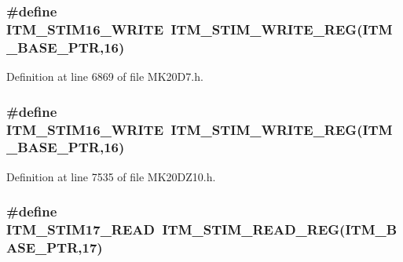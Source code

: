 \subsubsection[{\texorpdfstring{I\+T\+M\+\_\+\+S\+T\+I\+M16\+\_\+\+W\+R\+I\+TE}{ITM_STIM16_WRITE}}]{\setlength{\rightskip}{0pt plus 5cm}\#define I\+T\+M\+\_\+\+S\+T\+I\+M16\+\_\+\+W\+R\+I\+TE~{\bf I\+T\+M\+\_\+\+S\+T\+I\+M\+\_\+\+W\+R\+I\+T\+E\+\_\+\+R\+EG}({\bf I\+T\+M\+\_\+\+B\+A\+S\+E\+\_\+\+P\+TR},16)}\hypertarget{group___i_t_m___register___accessor___macros_gace1ad469c70d11bf39a60780830605f3}{}\label{group___i_t_m___register___accessor___macros_gace1ad469c70d11bf39a60780830605f3}


Definition at line 6869 of file M\+K20\+D7.\+h.

\subsubsection[{\texorpdfstring{I\+T\+M\+\_\+\+S\+T\+I\+M16\+\_\+\+W\+R\+I\+TE}{ITM_STIM16_WRITE}}]{\setlength{\rightskip}{0pt plus 5cm}\#define I\+T\+M\+\_\+\+S\+T\+I\+M16\+\_\+\+W\+R\+I\+TE~{\bf I\+T\+M\+\_\+\+S\+T\+I\+M\+\_\+\+W\+R\+I\+T\+E\+\_\+\+R\+EG}({\bf I\+T\+M\+\_\+\+B\+A\+S\+E\+\_\+\+P\+TR},16)}\hypertarget{group___i_t_m___register___accessor___macros_gace1ad469c70d11bf39a60780830605f3}{}\label{group___i_t_m___register___accessor___macros_gace1ad469c70d11bf39a60780830605f3}


Definition at line 7535 of file M\+K20\+D\+Z10.\+h.

\subsubsection[{\texorpdfstring{I\+T\+M\+\_\+\+S\+T\+I\+M17\+\_\+\+R\+E\+AD}{ITM_STIM17_READ}}]{\setlength{\rightskip}{0pt plus 5cm}\#define I\+T\+M\+\_\+\+S\+T\+I\+M17\+\_\+\+R\+E\+AD~{\bf I\+T\+M\+\_\+\+S\+T\+I\+M\+\_\+\+R\+E\+A\+D\+\_\+\+R\+EG}({\bf I\+T\+M\+\_\+\+B\+A\+S\+E\+\_\+\+P\+TR},17)}\hypertarget{group___i_t_m___register___accessor___macros_ga3f00966b4f023808c0d22b5c88d9ad84}{}\label{group___i_t_m___register___accessor___macros_ga3f00966b4f023808c0d22b5c88d9ad84}


